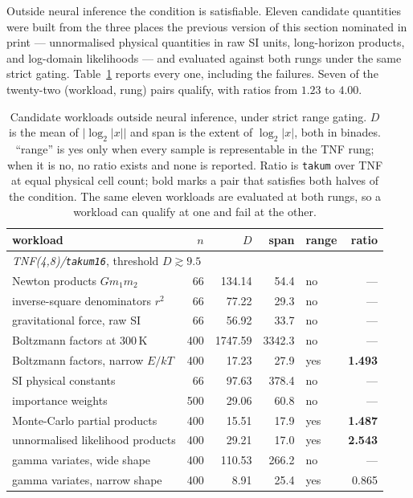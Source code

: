 \documentclass[11pt]{article}
\theoremstyle{definition}
\begin{document}
Outside neural inference the condition is satisfiable. Eleven candidate
quantities were built from the three places the previous version of this section
nominated in print --- unnormalised physical quantities in raw SI units,
long-horizon products, and log-domain likelihoods --- and evaluated against both
rungs under the same strict gating. Table~\ref{tab:workloads} reports every one,
including the failures. Seven of the twenty-two (workload, rung) pairs qualify,
with ratios from $1.23$ to $4.00$.

\begin{table}[htbp]\centering
\caption{Candidate workloads outside neural inference, under strict range gating.
$D$ is the mean of $\lvert \log_2|x| \rvert$ and span is the extent of
$\log_2|x|$, both in binades. ``range'' is yes only when every sample is
representable in the TNF rung; when it is no, no ratio exists and none is
reported. Ratio is \texttt{takum} over TNF at equal physical cell count; bold
marks a pair that satisfies both halves of the condition. The same eleven
workloads are evaluated at both rungs, so a workload can qualify at one and fail
at the other.}
\label{tab:workloads}
\begin{tabular}{lrrrlr}
\hline
workload & $n$ & $D$ & span & range & ratio \\
\hline
\multicolumn{6}{l}{\emph{TNF(4,8)/\texttt{takum16}}, threshold $D \gtrsim 9.5$}\\
\hline
Newton products $Gm_1m_2$ & 66 & 134.14 & 54.4 & no & --- \\
inverse-square denominators $r^2$ & 66 & 77.22 & 29.3 & no & --- \\
gravitational force, raw SI & 66 & 56.92 & 33.7 & no & --- \\
Boltzmann factors at $300$\,K & 400 & 1747.59 & 3342.3 & no & --- \\
Boltzmann factors, narrow $E/kT$ & 400 & 17.23 & 27.9 & yes & \textbf{1.493} \\
SI physical constants & 66 & 97.63 & 378.4 & no & --- \\
importance weights & 500 & 29.06 & 60.8 & no & --- \\
Monte-Carlo partial products & 400 & 15.51 & 17.9 & yes & \textbf{1.487} \\
unnormalised likelihood products & 400 & 29.21 & 17.0 & yes & \textbf{2.543} \\
gamma variates, wide shape & 400 & 110.53 & 266.2 & no & --- \\
gamma variates, narrow shape & 400 & 8.91 & 25.4 & yes & 0.865 \\

\end{tabular}
\end{table}
\end{document}
